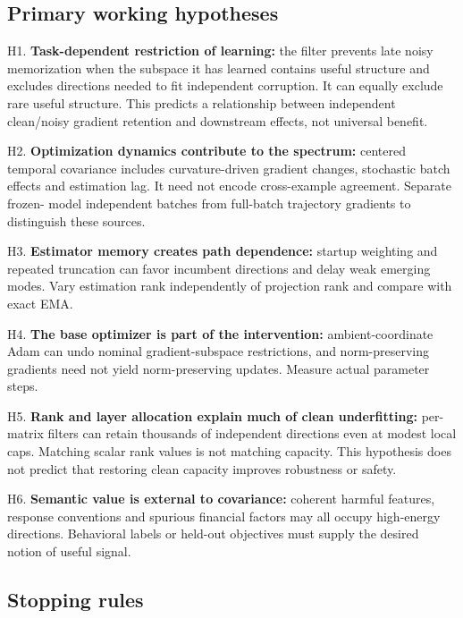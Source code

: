 \documentclass[
  british,
  10pt,
  a4paper,
]{article}
\begin{document}
\subsection{Primary working
hypotheses}\label{hypotheses-and-tests--primary-working-hypotheses}

H1. \textbf{Task-\allowbreak{}dependent restriction of learning:} the
filter prevents late noisy memorization when the subspace it has learned
contains useful structure and excludes directions needed to fit
independent corruption.\allowbreak{} It can equally exclude rare useful
structure. This predicts a relationship between independent
clean/\allowbreak{}noisy gradient retention and downstream effects, not
universal benefit.

H2. \textbf{Optimization dynamics contribute to the spectrum:} centered
temporal covariance includes curvature-\allowbreak{}driven gradient
changes, stochastic batch effects and estimation lag. It need not encode
cross-\allowbreak{}example agreement. Separate frozen- model independent
batches from full-batch trajectory gradients to distinguish these
sources.

H3. \textbf{Estimator memory creates path dependence:} startup weighting
and repeated truncation can favor incumbent directions and delay weak
emerging modes. Vary estimation rank independently of projection rank
and compare with exact EMA.

H4. \textbf{The base optimizer is part of the intervention:}
ambient-\allowbreak{}coordinate Adam can undo nominal
gradient-\allowbreak{}subspace restrictions\allowbreak{},\allowbreak{}
and norm-\allowbreak{}preserving gradients need not yield
norm-\allowbreak{}preserving updates. Measure actual parameter steps.

H5. \textbf{Rank and layer allocation explain much of clean
underfitting:} per-matrix filters can retain thousands of independent
directions even at modest local caps. Matching scalar rank values is not
matching capacity. This hypothesis does not predict that restoring clean
capacity improves robustness or safety.

H6. \textbf{Semantic value is external to covariance:} coherent harmful
features, response conventions and spurious financial factors may all
occupy high-\allowbreak{}energy directions.\allowbreak{} Behavioral
labels or held-out objectives must supply the desired notion of useful
signal.

\subsection{Stopping rules}\label{hypotheses-and-tests--stopping-rules}
\end{document}
